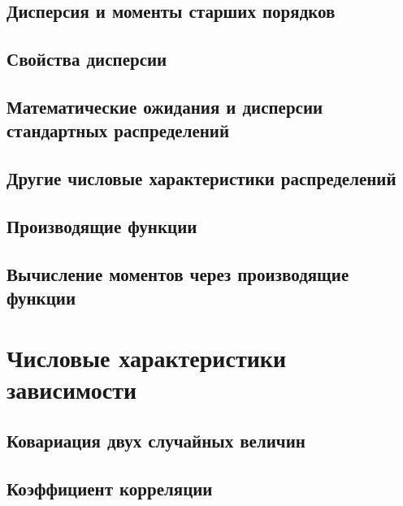 \subsection{Дисперсия и моменты старших порядков}


\subsection{Свойства дисперсии}


\subsection{Математические ожидания и дисперсии стандартных распределений}


\subsection{Другие числовые характеристики распределений}


\subsection{Производящие функции}


% 

\subsection{Вычисление моментов через производящие функции}




\section{Числовые характеристики зависимости}

\subsection{Ковариация двух случайных величин}


\subsection{Коэффициент корреляции}





